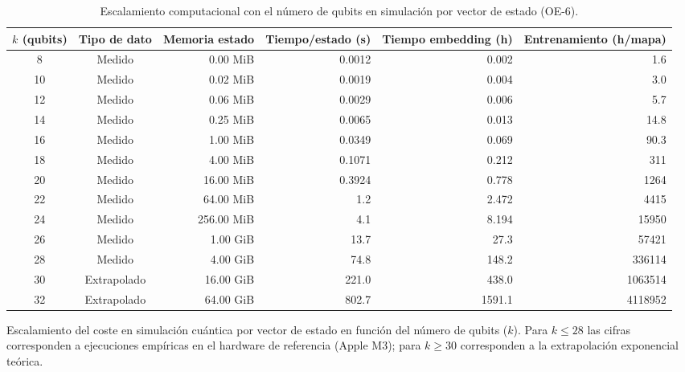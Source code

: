 \begin{table}[H]
\centering
\small
\caption{Escalamiento computacional con el número de qubits en simulación por vector de estado (OE-6).}
\label{tab:anexo_m8_oe6_qubits}
\begin{adjustbox}{max width=\linewidth}
\begin{tabular}{c c r r r r}
\toprule
$k$ (qubits) & Tipo de dato & Memoria estado & Tiempo/estado (s) & Tiempo embedding (h) & Entrenamiento (h/mapa) \\
\midrule
8 & Medido & 0.00 MiB & 0.0012 & 0.002 & 1.6 \\
10 & Medido & 0.02 MiB & 0.0019 & 0.004 & 3.0 \\
12 & Medido & 0.06 MiB & 0.0029 & 0.006 & 5.7 \\
14 & Medido & 0.25 MiB & 0.0065 & 0.013 & 14.8 \\
16 & Medido & 1.00 MiB & 0.0349 & 0.069 & 90.3 \\
18 & Medido & 4.00 MiB & 0.1071 & 0.212 & 311 \\
20 & Medido & 16.00 MiB & 0.3924 & 0.778 & 1264 \\
22 & Medido & 64.00 MiB & 1.2 & 2.472 & 4415 \\
24 & Medido & 256.00 MiB & 4.1 & 8.194 & 15950 \\
26 & Medido & 1.00 GiB & 13.7 & 27.3 & 57421 \\
28 & Medido & 4.00 GiB & 74.8 & 148.2 & 336114 \\
30 & Extrapolado & 16.00 GiB & 221.0 & 438.0 & 1063514 \\
32 & Extrapolado & 64.00 GiB & 802.7 & 1591.1 & 4118952 \\
\bottomrule
\end{tabular}
\end{adjustbox}
\par\smallskip
\parbox{0.95\linewidth}{\footnotesize Escalamiento del coste en simulación cuántica por vector de estado en función del número de qubits ($k$). Para $k \le 28$ las cifras corresponden a ejecuciones empíricas en el hardware de referencia (Apple M3); para $k \ge 30$ corresponden a la extrapolación exponencial teórica.}
\end{table}
